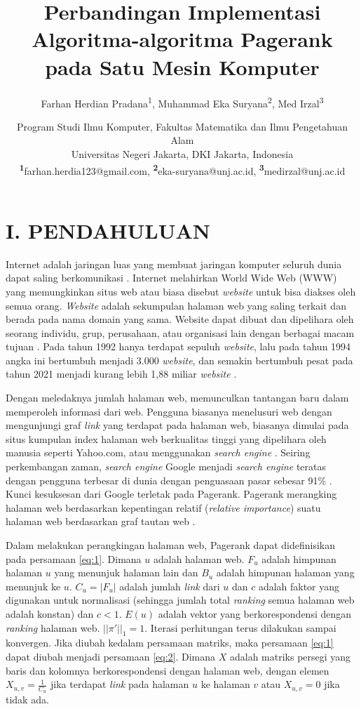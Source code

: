 \documentclass[
	a4paper, %
	12pt, %
	unnumberedsections, %
	twoside, %
]{LTJournalArticle}
\title{Perbandingan Implementasi Algoritma-algoritma Pagerank pada Satu Mesin Komputer} %
\author{%
	Farhan Herdian Pradana\textsuperscript{1}, Muhammad Eka Suryana\textsuperscript{2}, Med Irzal\textsuperscript{3}
}
\date{
	\footnotesize
	Program Studi Ilmu Komputer, Fakultas Matematika dan Ilmu Pengetahuan Alam \\
	Universitas Negeri Jakarta, DKI Jakarta, Indonesia \\
	\textsuperscript{\textbf{1}}farhan.herdia123@gmail.com, 
	\textsuperscript{\textbf{2}}eka-suryana@unj.ac.id, 
	\textsuperscript{\textbf{3}}medirzal@unj.ac.id
}
\begin{document}
\maketitle %


\section{I. PENDAHULUAN}

Internet adalah jaringan luas yang membuat jaringan komputer seluruh dunia dapat saling berkomunikasi \citep{sample2018internet}. Internet melahirkan World Wide Web (WWW) yang memungkinkan situs web atau biasa disebut \textit{website} untuk bisa diakses oleh semua orang. \textit{Website} adalah sekumpulan halaman web yang saling terkait dan berada pada nama domain yang sama. Website dapat dibuat dan dipelihara oleh seorang individu, grup, perusahaan, atau organisasi lain dengan berbagai macam tujuan \citep{techopedia2020website}. Pada tahun 1992 hanya terdapat sepuluh \textit{website}, lalu pada tahun 1994 angka ini bertumbuh menjadi 3.000 \textit{website}, dan semakin bertumbuh pesat pada tahun 2021 menjadi kurang lebih 1,88 miliar \textit{website} \citep{amstrong2021website}.

Dengan meledaknya jumlah halaman web, memunculkan tantangan baru dalam memperoleh informasi dari web. Pengguna biasanya menelusuri web dengan mengunjungi graf \textit{link} yang terdapat pada halaman web, biasanya dimulai pada situs kumpulan index halaman web berkualitas tinggi yang dipelihara oleh manusia seperti Yahoo.com, atau menggunakan \textit{search engine} \citep{brin1998anatomy}. Seiring perkembangan zaman, \textit{search engine} Google menjadi \textit{search engine} teratas dengan pengguna terbesar di dunia dengan penguasaan pasar sebesar 91\% \citep{gsc2022marketshare}. Kunci kesuksesan dari Google terletak pada Pagerank. Pagerank merangking halaman web berdasarkan kepentingan relatif (\textit{relative importance}) suatu halaman web berdasarkan graf tautan web \citep{ilprints422}. 

Dalam melakukan perangkingan halaman web, Pagerank dapat didefinisikan pada persamaan \ref{eq:1}. Dimana $u$ adalah halaman web. $F_u$ adalah himpunan halaman $u$ yang menunjuk halaman lain dan $B_u$ adalah himpunan halaman yang menunjuk ke $u$. $C_u = |F_u|$ adalah jumlah \textit{link} dari $u$ dan $c$ adalah faktor yang digunakan untuk normalisasi (sehingga jumlah total \textit{ranking} semua halaman web adalah konstan) dan $c < 1$. $E(u)$ adalah vektor yang berkorespondensi dengan \textit{ranking} halaman web. $||\pi'||_1 = 1$. Iterasi perhitungan terus dilakukan sampai konvergen. Jika diubah kedalam persamaan matriks, maka persamaan \ref{eq:1} dapat diubah menjadi persamaan \ref{eq:2}. Dimana $X$ adalah matriks persegi yang baris dan kolomnya berkorespondensi dengan halaman web, dengan elemen $X_{u,v} = \frac{1}{C_u}$ jika terdapat \textit{link} pada halaman $u$ ke halaman $v$ atau $X_{u,v} = 0$ jika tidak ada.
\end{document}
